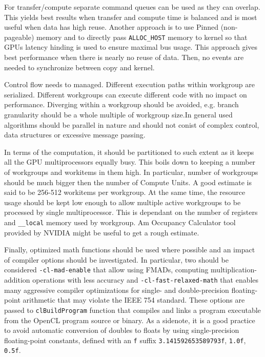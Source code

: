 For transfer/compute separate command queues can be used as they can overlap. This yields best results when transfer and compute time is balanced and is most useful when data has high reuse. Another approach is to use Pinned (non-pageable) memory and to directly pass \texttt{ALLOC\_HOST} memory to kernel so that GPUs latency hinding is used to ensure maximal bus usage. This approach gives best performance when there is nearly no reuse of data. Then, no events are needed to synchronize between copy and kernel.

Control flow needs to managed. Different execution paths within workgroup are serialized. Different workgroups can execute different code with no impact on performance. Diverging within a workgroup should be avoided, e.g. branch granularity should be a whole multiple of workgroup size.In general used algorithms should be parallel in nature and should not conist of complex control, data structures or excessive message passing.

In terms of the computation, it should be partitioned to such extent as it keeps all the GPU multiprocessors equally busy. This boils down to keeping a number of workgroups and workitems in them high. In particular, number of workgroups should be much bigger then the number of Compute Units. A good estimate is said to be 256-512 workitems per workgroup. At the same time, the resource usage should be kept low enough to allow multiple active workgroups to be processed by single multiprocessor. This is dependant on the number of registers and \texttt{\_\_local} memory used by workgroup. Am Occupancy Calculator tool provided by NVIDIA might be useful to get a rough estimate.

Finally, optimized math functions should be used where possible and an impact of compiler options should be investigated. In particular, two should be considered \texttt{-cl-mad-enable} that allow using FMADs, computing multiplication-addition operations with less accuracy and \texttt{-cl-fast-relaxed-math} that enables many aggressive compiler optimizations for single- and double-precision floating-point arithmetic that may violate the IEEE 754 standard. These options are passed to \texttt{clBuildProgram} function that compiles and links a program executable from the OpenCL program source or binary.\cite{nvidia2011openclbest, nvidia2012openclprog} As a sidenote, it is a good practice to avoid automatic conversion of doubles to floats by using single-precision floating-point constants, defined with an \texttt{f} suffix \texttt{3.141592653589793f}, \texttt{1.0f}, \texttt{0.5f}.

